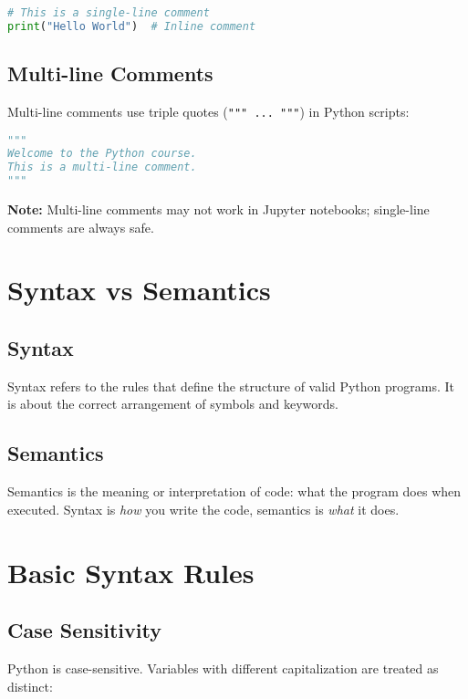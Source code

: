 \begin{lstlisting}[language=Python, caption={Single-line comment}]
# This is a single-line comment
print("Hello World")  # Inline comment
\end{lstlisting}

\subsection{Multi-line Comments}

Multi-line comments use triple quotes (\texttt{""" ... """}) in Python scripts:

\begin{lstlisting}[language=Python, caption={Multi-line comment}]
"""
Welcome to the Python course.
This is a multi-line comment.
"""
\end{lstlisting}

\textbf{Note:} Multi-line comments may not work in Jupyter notebooks; single-line comments are always safe.

\section{Syntax vs Semantics}

\subsection{Syntax}

Syntax refers to the rules that define the structure of valid Python programs.  
It is about the correct arrangement of symbols and keywords.

\subsection{Semantics}

Semantics is the meaning or interpretation of code: what the program does when executed.  
Syntax is \emph{how} you write the code, semantics is \emph{what} it does.

\section{Basic Syntax Rules}

\subsection{Case Sensitivity}

Python is case-sensitive. Variables with different capitalization are treated as distinct:

